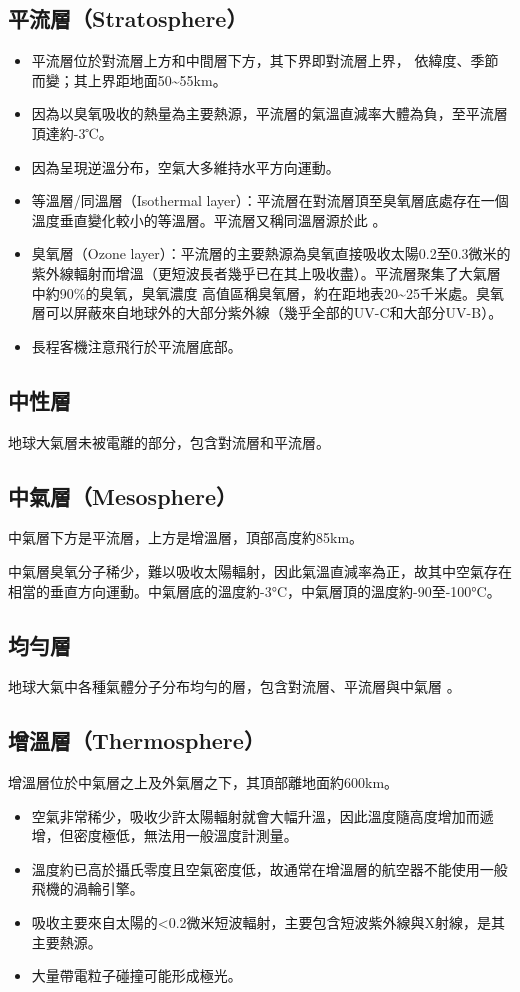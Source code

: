 \documentclass[a4paper,12pt]{report}
\begin{document}
\subsection{平流層（Stratosphere）}
\begin{itemize}
  \item 平流層位於對流層上方和中間層下方，其下界即對流層上界， 依緯度、季節而變；其上界距地面50\sim 55km。
  \item 因為以臭氧吸收的熱量為主要熱源，平流層的氣溫直減率大體為負，至平流層頂達約-3℃。
  \item 因為呈現逆溫分布，空氣大多維持水平方向運動。
  \item 等溫層/同溫層（Isothermal layer）：平流層在對流層頂至臭氧層底處存在一個溫度垂直變化較小的等溫層。平流層又稱同溫層源於此 。
  \item 臭氧層（Ozone layer）：平流層的主要熱源為臭氧直接吸收太陽0.2至0.3微米的紫外線輻射而增溫（更短波長者幾乎已在其上吸收盡）。平流層聚集了大氣層中約90\%的臭氧，臭氧濃度 高值區稱臭氧層，約在距地表20\sim 25千米處。臭氧層可以屏蔽來自地球外的大部分紫外線（幾乎全部的UV-C和大部分UV-B）。
  \item 長程客機注意飛行於平流層底部。
\end{itemize}
\subsection{中性層}
地球大氣層未被電離的部分，包含對流層和平流層。
\subsection{中氣層（Mesosphere）}
中氣層下方是平流層，上方是增溫層，頂部高度約85km。

中氣層臭氧分子稀少，難以吸收太陽輻射，因此氣溫直減率為正，故其中空氣存在相當的垂直方向運動。中氣層底的溫度約-3°C，中氣層頂的溫度約-90至-100°C。
\subsection{均勻層}
地球大氣中各種氣體分子分布均勻的層，包含對流層、平流層與中氣層 。
\subsection{增溫層（Thermosphere）}
增溫層位於中氣層之上及外氣層之下，其頂部離地面約600km。
\begin{itemize}
\item 空氣非常稀少，吸收少許太陽輻射就會大幅升溫，因此溫度隨高度增加而遞增，但密度極低，無法用一般溫度計測量。
\item 溫度約已高於攝氏零度且空氣密度低，故通常在增溫層的航空器不能使用一般飛機的渦輪引擎。
\item 吸收主要來自太陽的<0.2微米短波輻射，主要包含短波紫外線與X射線，是其主要熱源。
\item 大量帶電粒子碰撞可能形成極光。
\end{itemize}
\end{document}
